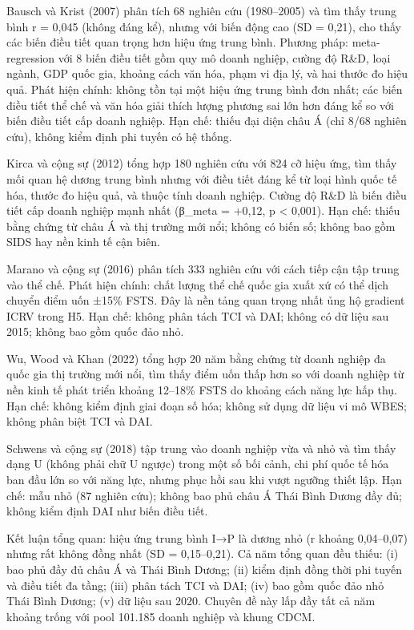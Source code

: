 \documentclass[12pt,a4paper]{article}
\begin{document}
Bausch và Krist (2007) phân tích 68 nghiên cứu (1980--2005) và tìm thấy
trung bình r = 0,045 (không đáng kể), nhưng với biến động cao (SD =
0,21), cho thấy các biến điều tiết quan trọng hơn hiệu ứng trung bình.
Phương pháp: meta-regression với 8 biến điều tiết gồm quy mô doanh
nghiệp, cường độ R\&D, loại ngành, GDP quốc gia, khoảng cách văn hóa,
phạm vi địa lý, và hai thước đo hiệu quả. Phát hiện chính: không tồn tại
một hiệu ứng trung bình đơn nhất; các biến điều tiết thể chế và văn hóa
giải thích lượng phương sai lớn hơn đáng kể so với biến điều tiết cấp
doanh nghiệp. Hạn chế: thiếu đại diện châu Á (chỉ 8/68 nghiên cứu),
không kiểm định phi tuyến có hệ thống.

Kirca và cộng sự (2012) tổng hợp 180 nghiên cứu với 824 cỡ hiệu ứng, tìm
thấy mối quan hệ dương trung bình nhưng với điều tiết đáng kể từ loại
hình quốc tế hóa, thước đo hiệu quả, và thuộc tính doanh nghiệp. Cường
độ R\&D là biến điều tiết cấp doanh nghiệp mạnh nhất (β\_meta = +0,12, p
\textless{} 0,001). Hạn chế: thiếu bằng chứng từ châu Á và thị trường
mới nổi; không có biến số; không bao gồm SIDS hay nền kinh tế cận biên.

Marano và cộng sự (2016) phân tích 333 nghiên cứu với cách tiếp cận tập
trung vào thể chế. Phát hiện chính: chất lượng thể chế quốc gia xuất xứ
có thể dịch chuyển điểm uốn ±15\% FSTS. Đây là nền tảng quan trọng nhất
ủng hộ gradient ICRV trong H5. Hạn chế: không phân tách TCI và DAI;
không có dữ liệu sau 2015; không bao gồm quốc đảo nhỏ.

Wu, Wood và Khan (2022) tổng hợp 20 năm bằng chứng từ doanh nghiệp đa
quốc gia thị trường mới nổi, tìm thấy điểm uốn thấp hơn so với doanh
nghiệp từ nền kinh tế phát triển khoảng 12--18\% FSTS do khoảng cách
năng lực hấp thụ. Hạn chế: không kiểm định giai đoạn số hóa; không sử
dụng dữ liệu vi mô WBES; không phân biệt TCI và DAI.

Schwens và cộng sự (2018) tập trung vào doanh nghiệp vừa và nhỏ và tìm
thấy dạng U (không phải chữ U ngược) trong một số bối cảnh, chi phí quốc
tế hóa ban đầu lớn so với năng lực, nhưng phục hồi sau khi vượt ngưỡng
thiết lập. Hạn chế: mẫu nhỏ (87 nghiên cứu); không bao phủ châu Á Thái
Bình Dương đầy đủ; không kiểm định DAI như biến điều tiết.

Kết luận tổng quan: hiệu ứng trung bình I→P là dương nhỏ (r khoảng
0,04--0,07) nhưng rất không đồng nhất (SD = 0,15--0,21). Cả năm tổng
quan đều thiếu: (i) bao phủ đầy đủ châu Á và Thái Bình Dương; (ii) kiểm
định đồng thời phi tuyến và điều tiết đa tầng; (iii) phân tách TCI và
DAI; (iv) bao gồm quốc đảo nhỏ Thái Bình Dương; (v) dữ liệu sau 2020.
Chuyên đề này lấp đầy tất cả năm khoảng trống với pool 101.185 doanh
nghiệp và khung CDCM.
\end{document}
